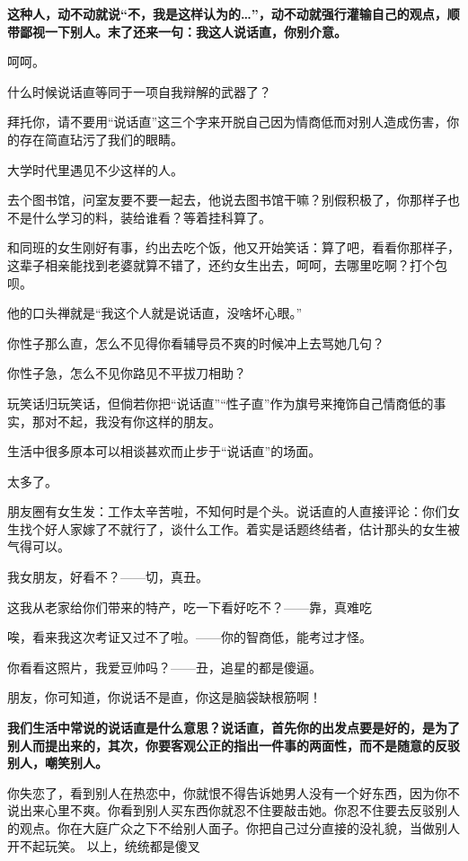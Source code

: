 \documentclass[UTF8,a4paper,8pt]{ctexbook}
\begin{document}
	\textbf{这种人，动不动就说“不，我是这样认为的…”，动不动就强行灌输自己的观点，顺带鄙视一下别人。末了还来一句：我这人说话直，你别介意。}
	
	呵呵。
	
	什么时候说话直等同于一项自我辩解的武器了？
	
	拜托你，请不要用“说话直”这三个字来开脱自己因为情商低而对别人造成伤害，你的存在简直玷污了我们的眼睛。
	
	
	大学时代里遇见不少这样的人。
	
	去个图书馆，问室友要不要一起去，他说去图书馆干嘛？别假积极了，你那样子也不是什么学习的料，装给谁看？等着挂科算了。
	
	和同班的女生刚好有事，约出去吃个饭，他又开始笑话：算了吧，看看你那样子，这辈子相亲能找到老婆就算不错了，还约女生出去，呵呵，去哪里吃啊？打个包呗。
	
	他的口头禅就是“我这个人就是说话直，没啥坏心眼。”
	
	你性子那么直，怎么不见得你看辅导员不爽的时候冲上去骂她几句？
	
	你性子急，怎么不见你路见不平拔刀相助？
	
	玩笑话归玩笑话，但倘若你把“说话直”“性子直”作为旗号来掩饰自己情商低的事实，那对不起，我没有你这样的朋友。
	
	
	
	生活中很多原本可以相谈甚欢而止步于“说话直”的场面。
	
	太多了。
	
	朋友圈有女生发：工作太辛苦啦，不知何时是个头。说话直的人直接评论：你们女生找个好人家嫁了不就行了，谈什么工作。着实是话题终结者，估计那头的女生被气得可以。
	
	我女朋友，好看不？——切，真丑。
	
	这我从老家给你们带来的特产，吃一下看好吃不？——靠，真难吃
	
	唉，看来我这次考证又过不了啦。——你的智商低，能考过才怪。
	
	你看看这照片，我爱豆帅吗？——丑，追星的都是傻逼。
	
	朋友，你可知道，你说话不是直，你这是脑袋缺根筋啊！
	
	\textbf{我们生活中常说的说话直是什么意思？说话直，首先你的出发点要是好的，是为了别人而提出来的，其次，你要客观公正的指出一件事的两面性，而不是随意的反驳别人，嘲笑别人。}
	
	你失恋了，看到别人在热恋中，你就恨不得告诉她男人没有一个好东西，因为你不说出来心里不爽。你看到别人买东西你就忍不住要敲击她。你忍不住要去反驳别人的观点。你在大庭广众之下不给别人面子。你把自己过分直接的没礼貌，当做别人开不起玩笑。
	以上，统统都是傻叉
	
\end{document}
